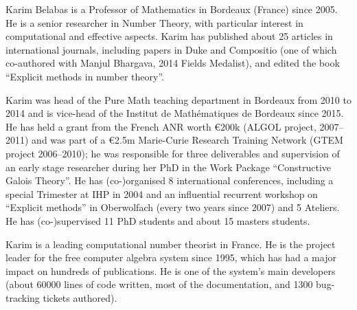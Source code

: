 \begin{participant}[type=PI,PM=14,gender=male]{Karim Belabas}
is a Professor of Mathematics in Bordeaux (France) since 2005. He is
a senior researcher in Number Theory, with particular interest in
computational and effective aspects. Karim has published about 25 articles
in international journals, including papers in Duke and Compositio (one of
which co-authored with Manjul Bhargava, 2014 Fields Medalist), and
edited the book ``Explicit methods in number theory''.

Karim was head of the Pure Math teaching department in Bordeaux from 2010 to
2014 and is vice-head of the Institut de Math\'ematiques de Bordeaux since
2015. He has held a grant from the French ANR worth \euro$200$k (ALGOL
project, 2007--2011) and was part of a \euro{2.5}m Marie-Curie Research
Training Network (GTEM project 2006--2010); he was responsible for three
deliverables and supervision of an early stage researcher during her PhD in
the Work Package ``Constructive Galois Theory''. He has (co-)organised 8
international conferences, including a special Trimester at IHP in 2004 and
an influential recurrent workshop on ``Explicit methods'' in Oberwolfach
(every two years since 2007) and 5 \PariGP Ateliers. He has (co-)supervised
11 PhD students and about 15 masters students.

Karim is a leading computational number theorist in France. He
is the project leader for the \PariGP free computer algebra system since
1995, which has had a major impact on hundreds of publications. He is one of
the system's main developers (about 60000 lines of code written, most of the
documentation, and 1300 bug-tracking tickets authored).
\end{participant}
